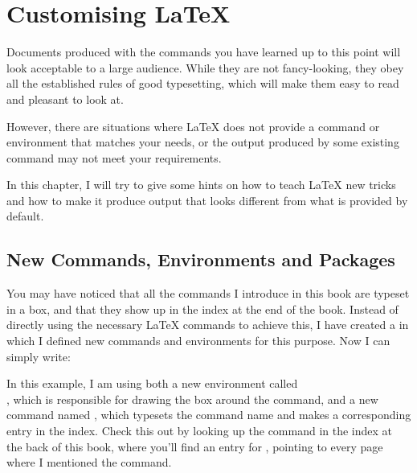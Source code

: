 \chapter{Customising \LaTeX}

\begin{intro}
Documents produced with the commands you have learned up to this
point will look acceptable to a large audience. While they are not
fancy-looking, they obey all the established rules of good
typesetting, which will make them easy to read and pleasant to look at.

However, there are situations where \LaTeX{} does not provide a
command or environment that matches your needs, or the output
produced by some existing command may not meet your requirements.

In this chapter, I will try to give some hints on
how to teach \LaTeX{} new tricks and how to make it produce output
that looks different from what is provided by default.
\end{intro}


\section{New Commands, Environments and Packages}

You may have noticed that all the commands I introduce in this
book are typeset in a box, and that they show up in the index at the end
of the book. Instead of directly using the necessary \LaTeX{} commands
to achieve this, I have created a  in which I defined new
commands and environments for this purpose. Now I can simply write:

\begin{example}
\begin{lscommand}
\end{lscommand}
\end{example}

In this example, I am using both a new environment called\\
, which is responsible for drawing the box around the
command, and a new command named , which typesets the command
name and makes a corresponding entry in the index. Check
this out by looking up the  command in the index at the back
of this book, where you'll find an entry for , pointing to
every page where I mentioned the  command.

